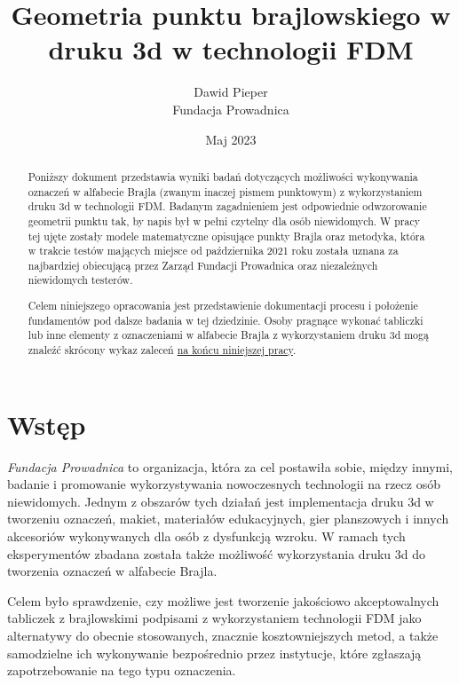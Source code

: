 \documentclass[12pt,a4paper]{article}
\begin{document}
\title{Geometria punktu brajlowskiego w druku 3d w technologii FDM}
\author{Dawid Pieper \\ Fundacja Prowadnica}
\date{Maj 2023}
\maketitle

\begin{abstract}
Poniższy dokument przedstawia wyniki badań dotyczących możliwości wykonywania oznaczeń w alfabecie Brajla (zwanym inaczej pismem punktowym) z wykorzystaniem druku 3d w technologii FDM. Badanym zagadnieniem jest odpowiednie odwzorowanie geometrii punktu tak, by napis był w pełni czytelny dla osób niewidomych.
W pracy tej ujęte zostały modele matematyczne opisujące punkty Brajla oraz metodyka, która w trakcie testów mających miejsce od października 2021 roku została uznana za najbardziej obiecującą przez Zarząd Fundacji Prowadnica oraz niezależnych niewidomych testerów.

Celem niniejszego opracowania jest przedstawienie dokumentacji procesu i położenie fundamentów pod dalsze badania w tej dziedzinie.
Osoby pragnące wykonać tabliczki lub inne elementy z oznaczeniami w alfabecie Brajla z wykorzystaniem druku 3d mogą znaleźć skrócony wykaz zaleceń \hyperref[sec:recommendations]{na końcu niniejszej pracy}.
\end{abstract}

\newpage

\tableofcontents

\newpage

\section{Wstęp}
\emph{Fundacja Prowadnica} to organizacja, która za cel postawiła sobie, między innymi, badanie i promowanie wykorzystywania nowoczesnych technologii na rzecz osób niewidomych. Jednym z obszarów tych działań jest implementacja druku 3d w tworzeniu oznaczeń, makiet, materiałów edukacyjnych, gier planszowych i innych akcesoriów wykonywanych dla osób z dysfunkcją wzroku.
W ramach tych eksperymentów zbadana została także możliwość wykorzystania druku 3d do tworzenia oznaczeń w alfabecie Brajla.

Celem było sprawdzenie, czy możliwe jest tworzenie jakościowo akceptowalnych tabliczek z brajlowskimi podpisami z wykorzystaniem technologii FDM jako alternatywy do obecnie stosowanych, znacznie kosztowniejszych metod, a także samodzielne ich wykonywanie bezpośrednio przez instytucje, które zgłaszają zapotrzebowanie na tego typu oznaczenia.
\end{document}

